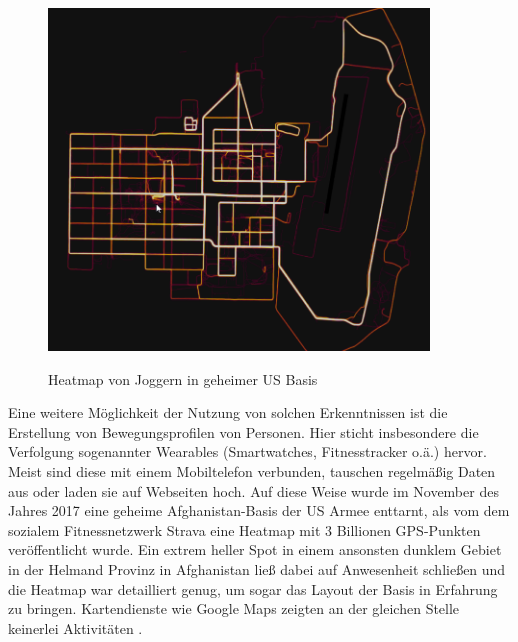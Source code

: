 \documentclass[12pt, a4paper, onecolumn, oneside, toc=bibliographynumbered, liststotoc]{scrreprt} %
\begin{document}
\begin{figure}[ht]
	\centering
	\caption{Heatmap von Joggern in geheimer US Basis}
	\includegraphics[width=0.9\textwidth]{Heatmap.png}
	\label{Heatmap}
\end{figure} 
  
  Eine weitere Möglichkeit der Nutzung von solchen Erkenntnissen ist die Erstellung von Bewegungsprofilen von Personen. Hier sticht insbesondere die Verfolgung sogenannter Wearables (Smartwatches, Fitnesstracker o.ä.) hervor. Meist sind diese mit einem Mobiltelefon verbunden, tauschen regelmäßig Daten aus oder laden sie auf Webseiten hoch. Auf diese Weise wurde im November des Jahres 2017 eine geheime Afghanistan-Basis der US Armee enttarnt, als vom dem sozialem Fitnessnetzwerk Strava eine Heatmap mit 3 Billionen GPS-Punkten veröffentlicht wurde. Ein extrem heller Spot in einem ansonsten dunklem Gebiet in der Helmand Provinz in Afghanistan ließ dabei auf Anwesenheit schließen und die Heatmap war detailliert genug, um sogar das Layout der Basis in Erfahrung zu bringen. Kartendienste wie Google Maps zeigten an der gleichen Stelle keinerlei Aktivitäten \parencite{.20180128}. 

        
\end{document}
